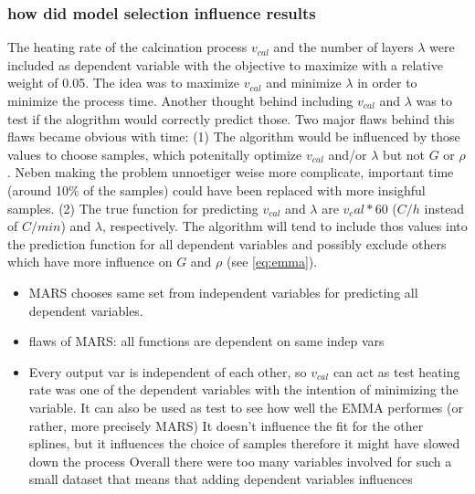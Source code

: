 \subsubsection{how did model selection influence results}
The heating rate of the calcination process $v_{cal}$ and the number of layers $\lambda$ were included as dependent variable with the objective to maximize with a relative weight of 0.05.
The idea was to maximize $v_{cal}$ and minimize $\lambda$ in order to minimize the process time. 
Another thought behind including $v_{cal}$ and $\lambda$ was to test if the alogrithm would correctly predict those. 
Two major flaws behind this flaws became obvious with time: 
(1) The algorithm would be influenced by those values to choose samples, which potenitally optimize $v_{cal}$ and/or $\lambda$ but not $G$ or $\rho$. 
Neben making the problem unnoetiger weise more complicate, important time (around 10\% of the samples) could have been replaced with more insighful samples. 
(2) The true function for predicting $v_{cal}$ and $\lambda$ are $v_cal*60$ ($C/h$ instead of $C/min$) and $\lambda$, respectively. 
The algorithm will tend to include thos values into the prediction function for all dependent variables and possibly exclude others which have more influence on $G$ and $\rho$ (see \ref{eq:emma}).
\begin{itemize}
    \item MARS chooses same set from independent variables for predicting all dependent variables. 
    \item flaws of MARS: all functions are dependent on same indep vars
    \item Every output var is independent of each other, so $v_{cal}$ can act as test 
heating rate was one of the dependent variables with the intention of minimizing the variable. 
It can also be used as test to see how well the EMMA performes (or rather, more precisely MARS)
It doesn't influence the fit for the other splines, but it influences the choice of samples therefore it might have slowed down the process
Overall there were too many variables involved for such a small dataset
        that means that adding dependent variables influences 
\end{itemize}

